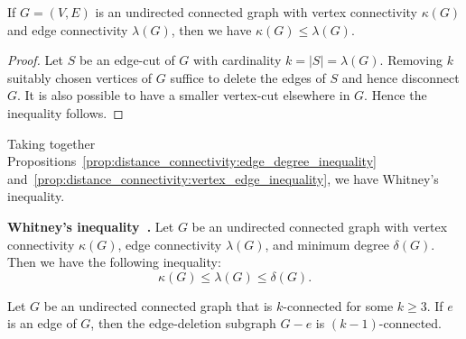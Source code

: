 




\begin{proposition}
\label{prop:distance_connectivity:vertex_edge_inequality}
If $G = (V,E)$ is an undirected connected graph with vertex
connectivity $\kappa(G)$ and edge connectivity $\lambda(G)$, then we
have $\kappa(G) \leq \lambda(G)$.
\end{proposition}

\begin{proof}
Let $S$ be an edge-cut of $G$ with cardinality
$k = |S| = \lambda(G)$. Removing $k$ suitably chosen vertices of $G$
suffice to delete the edges of $S$ and hence disconnect $G$. It is
also possible to have a smaller vertex-cut elsewhere in $G$. Hence the
inequality follows.
\end{proof}

Taking together
Propositions~\ref{prop:distance_connectivity:edge_degree_inequality}
and~\ref{prop:distance_connectivity:vertex_edge_inequality}, we have
Whitney's inequality.

\begin{theorem}
\textbf{Whitney's inequality~\cite{Whitney1932}.}
Let $G$ be an undirected connected graph with vertex connectivity
$\kappa(G)$, edge connectivity $\lambda(G)$, and minimum degree
$\delta(G)$. Then we have the following inequality:
\[
\kappa(G)
\leq
\lambda(G)
\leq
\delta(G).
\]
\end{theorem}

\begin{proposition}
\label{prop:distance_connectivity:edge_removal_subgraph_k_minus_1_connected}
Let $G$ be an undirected connected graph that is $k$-connected for
some $k \geq 3$. If $e$ is an edge of $G$, then the edge-deletion
subgraph $G - e$ is $(k - 1)$-connected.
\end{proposition}

